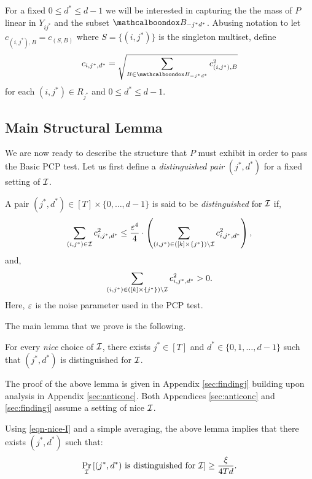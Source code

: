 For a fixed $0 \leq d^* \leq d-1$ we will be interested in capturing the
the mass of $P$ linear in $Y_{ij^*}$ and the subset
$\mcb{B}_{-j^*d^*}$. Abusing notation
to let $c_{(i,j^*), B} = c_{(S, B)}$ where $S = \{(i,j^*)\}$ is the
singleton multiset, define
\begin{equation}
c_{i,j^*,d^*} = \sqrt{\sum_{B \in \mcb{B}_{-j^*d^*}} c_{(i,j^*), B}^2} 
\label{eqn-lin-coeff}
\end{equation} 
for each $(i,j^*) \in R_{j^*}$ and $0 \leq d^* \leq d-1$. 

\subsection{Main Structural Lemma}
We are now ready to describe the structure that $P$ must exhibit in order to pass the Basic PCP test. 
Let us first define a {\em distinguished pair} $(j^*, d^*)$ for a fixed setting of $\mathcal{I}$.

\begin{definition}\label{def-distinguished-jd}
A pair $(j^*, d^*) \in [T]\times\{0,\dots,d-1\}$ is said to be
\emph{distinguished} for $\mathcal{I}$ if,
\begin{equation}
\sum_{(i,j^*) \in \mathcal{I}} c_{i,j^*,d^*}^2 \leq
\frac{\varepsilon^4}{4} \cdot \left(\sum_{(i,j^*) \in
([k]\times\{j^*\})\setminus\mathcal{I}} c_{i,j^*,d^*}^2\right), \label{eqn-main-nice-I-1}
\end{equation}
and,
\begin{equation}
\sum_{(i,j^*) \in
([k]\times\{j^*\})\setminus\mathcal{I}} c_{i,j^*,d^*}^2 > 0. \label{eqn-main-nice-I-3}
\end{equation}
Here, $\varepsilon$ is the noise parameter used in the PCP test.
\end{definition}

The main lemma that we prove is the following.

\begin{lemma}\label{lem-main-nice-I}
For every \emph{nice} choice of $\mathcal{I}$, there exists $j^* \in [T]$
and $d^* \in \{0,1,\dots, d-1\}$ such that $(j^*, d^*)$ is
distinguished for $\mathcal{I}$.
\end{lemma}
The proof of the above lemma is given in Appendix \ref{sec:findingj}
building upon analysis in Appendix \ref{sec:anticonc}. Both Appendices
\ref{sec:anticonc} and \ref{sec:findingj} assume a setting of nice $\mathcal{I}$.

Using \eqref{eqn-nice-I} and a simple averaging, 
the above lemma implies that there exists $(j^*, d^*)$ such that:
\begin{equation}
\Pr_{\mathcal{I}}\left[(j^*,d^*) \textnormal{ is distinguished for }\mathcal{I}\right] \geq
\frac{\xi}{4Td}.
\label{eqn-distinguished-I}
\end{equation}


